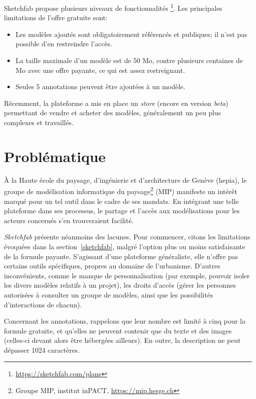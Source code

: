 Sketchfab propose plusieurs niveaux de fonctionnalités \footnote{\url{https://sketchfab.com/plans}}. Les principales limitations de l'offre gratuite sont:
\begin{itemize}
    \item Les modèles ajoutés sont obligatoirement référencés et publiques; il n'est pas possible d'en restreindre l'accès.
    \item La taille maximale d'un modèle est de 50 Mo, contre plusieurs centaines de Mo avec une offre payante, ce qui est assez restreignant.
    \item Seules 5 annotations peuvent être ajoutées à un modèle.
\end{itemize}

Récemment, la plateforme a mis en place un \textit{store} (encore en version \textit{beta}) permettant de vendre et acheter des modèles, généralement un peu plus complexes et travaillés.

\section{Problématique}

À la Haute école du paysage, d'ingénierie et d'architecture de Genève (hepia), le groupe de modélisation informatique du paysage\footnote{Groupe MIP, institut inPACT, \url{https://mip.hesge.ch}} (MIP) manifeste un intérêt marqué pour un tel outil dans le cadre de ses mandats. En intégrant une telle plateforme dans ses processus, le partage et l'accès aux modélisations pour les acteurs concernés s'en trouveraient facilité.

\textit{Sketchfab} présente néanmoins des lacunes. Pour commencer, citons les limitations évoquées dans la section~\ref{sketchfab}, malgré l'option plus ou moins satisfaisante de la formule payante.
S'agissant d'une plateforme généraliste, elle n'offre pas certains outils spécifiques, propres au domaine de l'urbanisme. D'autres inconvénients, comme le manque de personnalisation (par exemple, pouvoir isoler les divers modèles relatifs à un projet), les droits d'accès (gérer les personnes autorisées à consulter un groupe de modèles, ainsi que les possibilités d'interactions de chacun).

Concernant les annotations, rappelons que leur nombre est limité à cinq pour la formule gratuite, et qu'elles ne peuvent contenir que du texte et des images (celles-ci devant alors être hébergées ailleurs). En outre, la description ne peut dépasser 1024 caractères.

